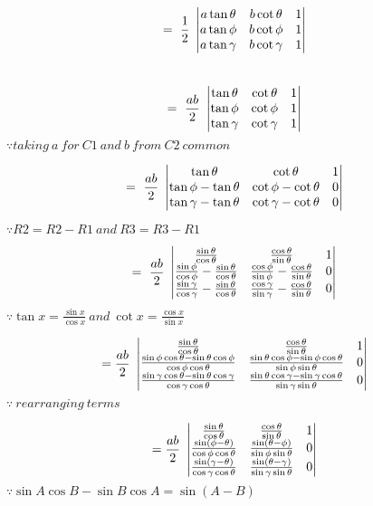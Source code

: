 \documentclass[journal,12pt,twocolumn]{IEEEtran}
\begin{document}
\begin{multline}
=~\frac{1}{2}~\begin{vmatrix}
 a\tan\theta & b\cot\theta & 1  \\ 
 a\tan\phi & b\cot\phi & 1  \\
 a\tan\gamma & b\cot\gamma & 1 
\end{vmatrix}\end{multline}\\
\begin{multline}
=~\frac{ab}{2}~\begin{vmatrix}
 \tan\theta & \cot\theta & 1  \\ 
 \tan\phi &   \cot\phi & 1  \\
 \tan\gamma & \cot\gamma & 1 
\end{vmatrix}
\end{multline}
$\because  taking ~a~ for ~C1 ~and~ b ~from~ C2~ common $

\begin{multline}
=~\frac{ab}{2}~\begin{vmatrix}
 \tan\theta & \cot\theta & 1  \\ 
 \tan\phi-\tan\theta & \cot\phi-\cot\theta & 0  \\
 \tan\gamma-\tan\theta & \cot\gamma-\cot\theta & 0 
\end{vmatrix}\end{multline}

$\because R2=R2-R1 ~and~ R3=R3-R1$

\begin{multline}
=~\frac{ab}{2}~\begin{vmatrix}
 \frac{\sin\theta}{\cos\theta} & \frac{\cos\theta}{\sin\theta} & 1  \\ 
 \frac{\sin\phi}{\cos\phi}-\frac{\sin\theta}{\cos\theta} & \frac{\cos\phi}{\sin\phi}-\frac{\cos\theta}{\sin\theta} & 0  \\
 \frac{\sin\gamma}{\cos\gamma}-\frac{\sin\theta}{\cos\theta} & \frac{\cos\gamma}{\sin\gamma}-\frac{\cos\theta}{\sin\theta} & 0 
\end{vmatrix}\end{multline}
$\because \tan x = \frac{\sin x}{\cos x}~and~\cot x = \frac{\cos x}{\sin x} $

\begin{multline}
=\frac{ab}{2}~\begin{vmatrix}
 \frac{\sin\theta}{\cos\theta} & \frac{\cos\theta}{\sin\theta} & 1  \\ 
 \frac{\sin\phi\cos\theta - \sin\theta\cos\phi}{\cos\phi\cos\theta} & \frac{\sin\theta\cos\phi - \sin\phi\cos\theta}{\sin\phi\sin\theta} & 0  \\
  \frac{\sin\gamma\cos\theta - \sin\theta\cos\gamma}{\cos\gamma\cos\theta} & \frac{\sin\theta\cos\gamma - \sin\gamma\cos\theta}{\sin\gamma\sin\theta} & 0
\end{vmatrix}   
\end{multline}
$\because ~rearranging ~terms $


\begin{multline}
=\frac{ab}{2}~\begin{vmatrix}
 \frac{\sin\theta}{\cos\theta} & \frac{\cos\theta}{\sin\theta} & 1  \\ 
 \frac{\sin(\phi-\theta)}{\cos\phi\cos\theta} & \frac{\sin(\theta-\phi)}{\sin\phi\sin\theta} & 0  \\
 \frac{\sin(\gamma-\theta)}{\cos\gamma\cos\theta} & \frac{\sin(\theta-\gamma)}{\sin\gamma\sin\theta} & 0 
\end{vmatrix}    
\end{multline}
$\because \sin A\cos B - \sin B\cos A = \sin(A-B)$
\end{document}

